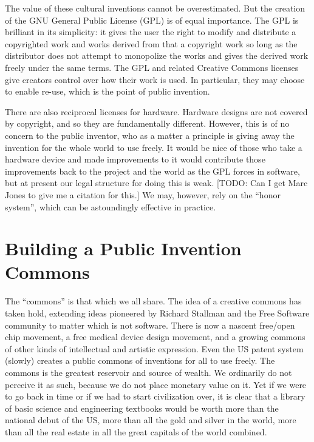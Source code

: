\documentclass[
	fontsize=10pt, %
	twoside=false, %
	secnumdepth=1, %
]{kaobook}
\begin{document}
The value of these cultural inventions cannot be overestimated.
But the creation of the GNU General Public License (GPL)
is of equal importance.
The GPL is brilliant in its simplicity: it gives the
user the right to modify and distribute a copyrighted work
and works derived from that a copyright work so long as
the distributor does not attempt to monopolize the works
and gives the derived work freely under the same terms.
The GPL and related Creative Commons licenses give
creators control over how their work is used.
In particular, they may choose to enable re-use, which
is the point of public invention.

There are also reciprocal licenses for hardware.
Hardware designs are not covered by copyright, and
so they are fundamentally different.
However, this is of no concern to the public inventor,
who as a matter a principle is giving away the invention
for the whole world to use freely.
It would be nice of those who take a hardware device and made
improvements to it would contribute those improvements
back to the project and the world as the GPL forces
in software, but at present our legal structure for
doing this is weak. [TODO: Can I get Marc Jones to give me a citation for this.]
We may, however, rely on the ``honor system'', which
can be astoundingly effective in practice.

\chapter{Building a Public Invention Commons}

The ``commons'' is that which we all share.
The idea of a creative commons has taken hold,
extending ideas pioneered by Richard Stallman and
the Free Software community to matter which is not
software.
There is now a nascent free/open chip
movement, a free medical device design movement, and a growing
commons of other kinds of intellectual and artistic
expression.
Even the US patent system (slowly) creates
a public commons of inventions for all to use freely.
The commons is the greatest reservoir and source of
wealth.
We ordinarily do not perceive it as such, because
we do not place monetary value on it.
Yet if we were to go back in time or if we
had to start civilization over, it is clear that
a library of basic science and engineering textbooks
would be worth more than the national debut of the US,
more than all the gold and silver in the world, more
than all the real estate in all the great capitals
of the world combined.
\end{document}
